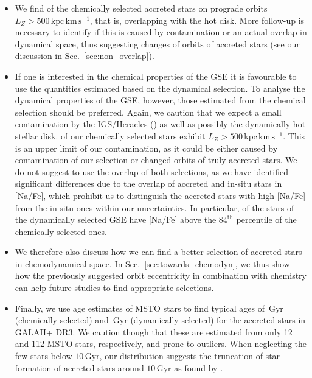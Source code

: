 \documentclass[fleqn,usenatbib]{mnras}
\newcommand{\Gyr}{\,\mathrm{Gyr}}	%
\newcommand{\kpckms}{\,\mathrm{kpc\,km\,s^{-1}}}	%
\begin{document}
\begin{itemize}
\item We find  of the chemically selected accreted stars on prograde orbits $L_Z > 500 \kpckms$, that is, overlapping with the hot disk. More follow-up is necessary to identify if this is caused by contamination or an actual overlap in dynamical space, thus suggesting changes of orbits of accreted stars (see our discussion in Sec.~\ref{sec:non_overlap}).
\item If one is interested in the chemical properties of the GSE it is favourable to use the quantities estimated based on the dynamical selection. To analyse the dynamical properties of the GSE, however, those estimated from the chemical selection should be preferred. Again, we caution that we expect a small contamination by the IGS/Heracles () as well as possibly the dynamically hot stellar disk.  of our chemically selected stars exhibit $L_Z > 500\kpckms$. This is an upper limit of our contamination, as it could be either caused by contamination of our selection or changed orbits of truly accreted stars. We do not suggest to use the overlap of both selections, as we have identified significant differences due to the overlap of accreted and in-situ stars in [Na/Fe], which prohibit us to distinguish the accreted stars with high [Na/Fe] from the in-situ ones within our uncertainties. In particular,  of the stars of the dynamically selected GSE have [Na/Fe] above the $84^\text{th}$ percentile of the chemically selected ones.
\item We therefore also discuss how we can find a better selection of accreted stars in chemodynamical space. In Sec.~\ref{sec:towards_chemodyn}, we thus show how the previously suggested orbit eccentricity \citep[see e.g.][]{Mackereth2019, Naidu2020} in combination with chemistry can help future studies to find appropriate selections.
\item Finally, we use age estimates of MSTO stars to find typical ages of $\Gyr$ (chemically selected) and $\Gyr$ (dynamically selected) for the accreted stars in GALAH+ DR3. We caution though that these are estimated from only 12 and 112 MSTO stars, respectively, and prone to outliers. When neglecting the few stars below $10\Gyr$, our distribution suggests the truncation of star formation of accreted stars around $10\Gyr$ as found by \citet{Bonaca2020}.
\end{itemize}
\end{document}
